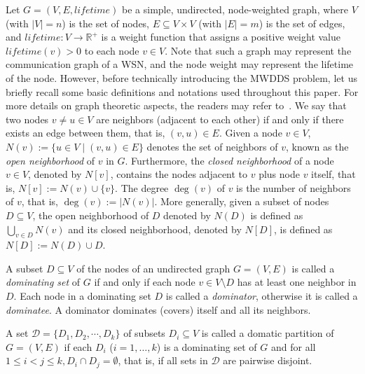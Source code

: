 \documentclass[algorithms,article,accept,moreauthors,pdftex]{Definitions/mdpi}
\begin{document}
Let $G = (V, E, lifetime)$ be a simple, undirected, node-weighted graph, where $V$ (with $|V|=n$) is the set of nodes, $E \subseteq V\times V$ (with $|E|=m$) is the set of edges, and $lifetime: V \rightarrow \mathbb{R}^{+}$ is a weight function that assigns a positive weight value $ lifetime(v)>0$ to each node $v \in V$. Note that such a graph may represent the communication graph of a WSN, and the node weight may represent the lifetime of the node. However, before technically introducing the MWDDS problem, let us briefly recall some basic definitions and notations used throughout this paper. For more details on graph theoretic aspects, the readers may refer to~\cite{hay2020:book_Domination}. We say that two nodes $v \not= u \in V$ are neighbors (adjacent to each other) if and only if there exists an edge between them, that is, $(v,u) \in E$. Given a node $v \in V$, $N(v):=\{u \in V \mid (v,u)\in E\}$ denotes the set of neighbors of $v$, known as the \emph{open neighborhood} of $v$ in $G$. Furthermore, the \emph{closed neighborhood} of a node $v \in V$, denoted by $N[v]$, contains the nodes adjacent to $v$ plus node $v$ itself, that is, $N[v]:=N(v)\cup \{ v \}$. The degree $\deg(v)$ of $v$ is the number of neighbors of $v$, that is, $\deg(v):=|N(v)|$. More generally, given a subset of nodes $ D \subseteq V$, the open neighborhood of $D$ denoted by $N(D)$ is defined as $ \bigcup_{v \in D}  N(v)$ and its closed neighborhood, denoted by $N[D]$, is defined as $N[D]:= N(D) \cup  D$.


\begin{Definition}  
A subset $D \subseteq V$ of the nodes of an undirected graph $G=(V,E)$ is called a \emph{dominating set} of $G$ if and only if each node $v \in V \setminus D$ has at least one neighbor in $D$. Each node in a dominating set $D$ is called a \emph{dominator}, otherwise it is called a \emph{dominatee}. A dominator dominates (covers) itself and all its neighbors.
\end{Definition}

\begin{Definition}
  
A set $\mathcal{D} =\{D_{1}, D_{2},\cdots, D_{k} \}$ of subsets $D_{i} \subseteq V$ is called a domatic partition of $G=(V,E)$ if each $D_i$ ($i=1,\ldots,k$) is a dominating set of $G$ and for all $1 \leq i < j \leq k, D_{i} \cap  D_{j} = \emptyset $, that is, if all sets in $\mathcal{D}$ are pairwise disjoint. 
\end{Definition}
\end{document}
